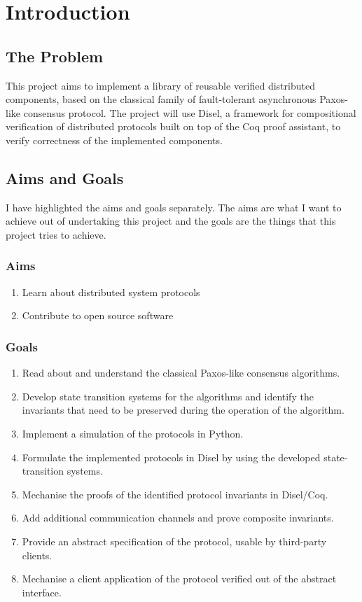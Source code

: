 \chapter{Introduction}

\section{The Problem}
This project aims to implement a library of reusable verified distributed components,
based on the classical family of fault-tolerant asynchronous Paxos-like consensus protocol.
The project will use Disel, a framework for compositional verification of distributed
protocols built on top of the Coq proof assistant, to verify correctness of the
implemented components.

\section{Aims and Goals}
I have highlighted the aims and goals separately. The aims are what I want to
achieve out of undertaking this project and the goals are the things that this
project tries to achieve.

\subsection{Aims}
\begin{enumerate}
\itemsep0em
  \item Learn about distributed system protocols
  \item Contribute to open source software
\end{enumerate}

\vspace{-5mm}
\subsection{Goals}
\begin{enumerate}
\itemsep0em
  \item Read about and understand the classical Paxos-like consensus algorithms.
  \item Develop state transition systems for the algorithms and identify the invariants that need to be preserved during the operation of the algorithm.
  \item Implement a simulation of the protocols in Python.
  \item Formulate the implemented protocols in Disel by using the developed state-transition systems.
  \item Mechanise the proofs of the identified protocol invariants in Disel/Coq.
  \item Add additional communication channels and prove composite invariants.
  \item Provide an abstract specification of the protocol, usable by third-party clients.
  \item Mechanise a client application of the protocol verified out of the abstract interface.
\end{enumerate}

